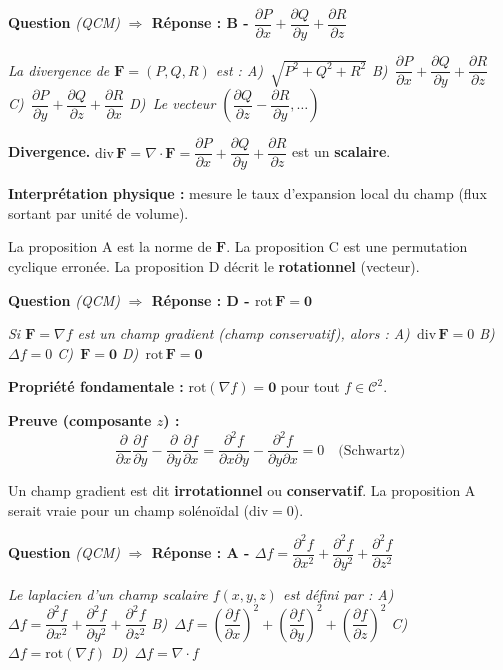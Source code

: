 \documentclass[11pt,a4paper]{article}
\newcounter{qnum}
\newcommand{\qtitre}[2]{%
  \stepcounter{qnum}%
  \medskip\noindent
  \textbf{\color{bleutexte}Question \theqnum}\enspace
  \textit{(#1)}\enspace
  \textcolor{vertok}{\textbf{$\Rightarrow$ Réponse : #2}}
  \par\smallskip
}
\newcommand{\qenonce}[1]{%
  \begin{mdframed}[backgroundcolor=grisbox, linewidth=0pt,
    innerleftmargin=8pt, innerrightmargin=8pt,
    innertopmargin=5pt, innerbottommargin=5pt,
    skipabove=2pt, skipbelow=4pt]
  \small\textit{#1}
  \end{mdframed}
}
\begin{document}
\qtitre{QCM}{B - $\dfrac{\partial P}{\partial x} + \dfrac{\partial Q}{\partial y} + \dfrac{\partial R}{\partial z}$}
\qenonce{La divergence de $\mathbf{F} = (P, Q, R)$ est :
\quad A)~$\sqrt{P^2+Q^2+R^2}$
\quad B)~$\dfrac{\partial P}{\partial x} + \dfrac{\partial Q}{\partial y} + \dfrac{\partial R}{\partial z}$
\quad C)~$\dfrac{\partial P}{\partial y} + \dfrac{\partial Q}{\partial z} + \dfrac{\partial R}{\partial x}$
\quad D)~Le vecteur $\left(\dfrac{\partial Q}{\partial z}-\dfrac{\partial R}{\partial y},\ldots\right)$}

\begin{methodebox}
\textbf{Divergence.} $\text{div}\,\mathbf{F} = \nabla\cdot\mathbf{F} = \dfrac{\partial P}{\partial x}+\dfrac{\partial Q}{\partial y}+\dfrac{\partial R}{\partial z}$ est un \textbf{scalaire}.

\textbf{Interprétation physique :} mesure le taux d'expansion local du champ (flux sortant par unité de volume).
\end{methodebox}

La proposition A est la norme de $\mathbf{F}$. La proposition C est une permutation cyclique erronée. La proposition D décrit le \textbf{rotationnel} (vecteur).

\qtitre{QCM}{D - $\text{rot}\,\mathbf{F} = \mathbf{0}$}
\qenonce{Si $\mathbf{F} = \nabla f$ est un champ gradient (champ conservatif), alors :
\quad A)~$\text{div}\,\mathbf{F} = 0$
\quad B)~$\Delta f = 0$
\quad C)~$\mathbf{F} = \mathbf{0}$
\quad D)~$\text{rot}\,\mathbf{F} = \mathbf{0}$}

\begin{methodebox}
\textbf{Propriété fondamentale :} $\text{rot}(\nabla f) = \mathbf{0}$ pour tout $f\in\mathcal{C}^2$.

\textbf{Preuve (composante $z$) :}
$$\frac{\partial}{\partial x}\frac{\partial f}{\partial y} - \frac{\partial}{\partial y}\frac{\partial f}{\partial x} = \frac{\partial^2 f}{\partial x\partial y} - \frac{\partial^2 f}{\partial y\partial x} = 0 \quad\text{(Schwartz)}$$

Un champ gradient est dit \textbf{irrotationnel} ou \textbf{conservatif}. La proposition A serait vraie pour un champ solénoïdal ($\text{div}=0$).
\end{methodebox}

\qtitre{QCM}{A - $\Delta f = \dfrac{\partial^2 f}{\partial x^2} + \dfrac{\partial^2 f}{\partial y^2} + \dfrac{\partial^2 f}{\partial z^2}$}
\qenonce{Le laplacien d'un champ scalaire $f(x,y,z)$ est défini par :
\quad A)~$\Delta f = \dfrac{\partial^2 f}{\partial x^2} + \dfrac{\partial^2 f}{\partial y^2} + \dfrac{\partial^2 f}{\partial z^2}$
\quad B)~$\Delta f = \left(\dfrac{\partial f}{\partial x}\right)^2 + \left(\dfrac{\partial f}{\partial y}\right)^2 + \left(\dfrac{\partial f}{\partial z}\right)^2$
\quad C)~$\Delta f = \text{rot}(\nabla f)$
\quad D)~$\Delta f = \nabla \cdot f$}
\end{document}
